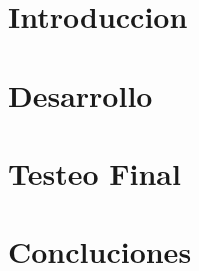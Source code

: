 \documentclass[10pt, a4paper]{article}
\begin{document}

\tableofcontents
\newpage
\section{Introduccion}

\section{Desarrollo}

\section{Testeo Final}

\section{Concluciones}

\end{document}
